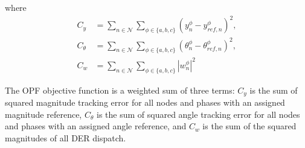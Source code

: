 \noindent where
\begin{align}
C_{y} &= \sum_{n \in \mathcal{N}} \sum_{\phi \in \{a,b,c \}} {\left( y_{n}^{\phi} - y_{ref,n}^{\phi} \right)}^{2}, \label{eq:OPF_Cy} \\
C_{\theta} &= \sum_{n \in \mathcal{N}} \sum_{\phi \in \{a,b,c \}} {\left( \theta_{n}^{\phi} - \theta_{ref,n}^{\phi} \right)}^{2}, \label{eq:OPF_Ctheta} \\
C_{w} &= \sum_{n \in \mathcal{N}} \sum_{\phi \in \{a,b,c \}} {\left| w_{n}^{\phi} \right|}^{2} \label{eq:OPF_Cw}
\end{align}

The OPF objective function is a weighted sum of three terms: $C_{y}$ is the sum of squared magnitude tracking error for all nodes and phases with an assigned magnitude reference, $C_{\theta}$ is the sum of squared angle tracking error for all nodes and phases with an assigned angle reference, and $C_{w}$ is the sum of the squared magnitudes of all DER dispatch.

